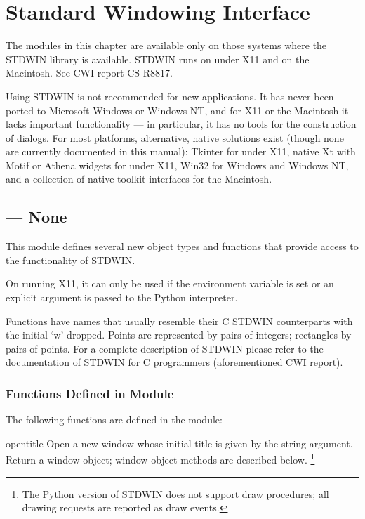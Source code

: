 \chapter{Standard Windowing Interface}

The modules in this chapter are available only on those systems where
the STDWIN library is available.  STDWIN runs on \UNIX{} under X11 and
on the Macintosh.  See CWI report CS-R8817.

 Using STDWIN is not recommended for new
applications.  It has never been ported to Microsoft Windows or
Windows NT, and for X11 or the Macintosh it lacks important
functionality --- in particular, it has no tools for the construction
of dialogs.  For most platforms, alternative, native solutions exist
(though none are currently documented in this manual): Tkinter for
\UNIX{} under X11, native Xt with Motif or Athena widgets for \UNIX{}
under X11, Win32 for Windows and Windows NT, and a collection of
native toolkit interfaces for the Macintosh.

\section{ ---
         None}



This module defines several new object types and functions that
provide access to the functionality of STDWIN.

On \UNIX{} running X11, it can only be used if the 
environment variable is set or an explicit  argument is passed to the Python interpreter.

Functions have names that usually resemble their C STDWIN counterparts
with the initial `w' dropped.
Points are represented by pairs of integers; rectangles
by pairs of points.
For a complete description of STDWIN please refer to the documentation
of STDWIN for C programmers (aforementioned CWI report).

\subsection{Functions Defined in Module }

The following functions are defined in the  module:

\begin{funcdesc}{open}{title}
Open a new window whose initial title is given by the string argument.
Return a window object; window object methods are described below.%
\footnote{The Python version of STDWIN does not support draw procedures; all
	drawing requests are reported as draw events.}
\end{funcdesc}

